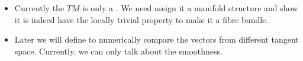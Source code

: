 \documentclass{article}
\begin{document}
\begin{enumerate}
\begin{itemize}
\begin{figure}[H]
\begin{center}
    \end{center}
\end{figure}
\item Currently the $TM$ is only a . We need assign it a manifold structure and show it is indeed have the locally trivial property to make it a fibre bundle.
\item Later we will define  to numerically compare the vectors from different tangent space. Currently, we can only talk about the smoothness.
\end{itemize}
\begin{figure}
    \centering
    

 
\tikzset{
pattern size/.store in=\mcSize, 
pattern size = 5pt,
pattern thickness/.store in=\mcThickness, 
pattern thickness = 0.3pt,
pattern radius/.store in=\mcRadius, 
pattern radius = 1pt}
\makeatletter
{}
\makeatother
{} %

\begin{tikzpicture}[x=0.75pt,y=0.75pt,yscale=-1,xscale=1]


\end{tikzpicture}
\end{figure}
\end{enumerate}
\end{document}
